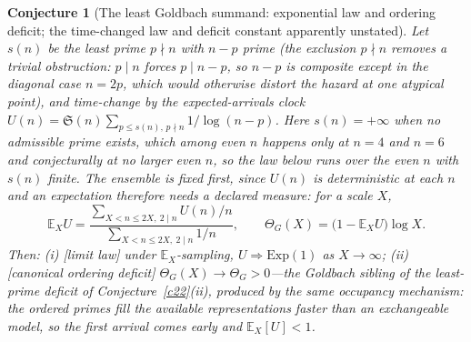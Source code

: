 \documentclass[11pt]{article}
\newtheorem{conjecture}{Conjecture}
\theoremstyle{definition}
\newcommand{\SG}{\mathfrak S}
\begin{document}
\setcounter{conjecture}{4}%
\begin{conjecture}[The least Goldbach summand: exponential law and
ordering deficit; the time-changed law and deficit constant
apparently unstated]\label{c15}
Let $s(n)$ be the least prime $p\nmid n$ with $n-p$ prime (the
exclusion $p\nmid n$ removes a trivial obstruction: $p\mid n$ forces $p\mid
n-p$, so $n-p$ is
composite except in the diagonal case $n=2p$, which would otherwise
distort the hazard at one atypical point), and
time-change by the expected-arrivals clock
$U(n)=\SG(n)\sum_{p\le s(n),\,p\nmid n}1/\log(n-p)$.  Here $s(n)=+\infty$ when no admissible prime exists, which among even $n$ happens only at $n=4$ and $n=6$ and conjecturally at no larger even $n$, so the law below runs over the even $n$ with $s(n)$ finite.  The ensemble is fixed first, since $U(n)$ is deterministic at each
$n$ and an expectation therefore needs a declared measure: for a scale
$X$,
\[
\mathbb E_XU=
\frac{\sum_{X<n\le2X,\ 2\mid n}U(n)/n}
{\sum_{X<n\le2X,\ 2\mid n}1/n},
\qquad
\Theta_G(X)=\bigl(1-\mathbb E_XU\bigr)\log X.
\]
Then: \emph{(i)} [limit law] under $\mathbb E_X$-sampling,
$U\Rightarrow\mathrm{Exp}(1)$ as $X\to\infty$;
\emph{(ii)} [canonical ordering deficit]
$\Theta_G(X)\to\Theta_G>0$---the Goldbach sibling of the
least-prime deficit of Conjecture~\ref{c22}(ii), produced by the
same occupancy mechanism: the ordered primes fill the available
representations faster than an exchangeable model, so the first
arrival comes \emph{early} and $\mathbb E_X[U]<1$.
\end{conjecture}
\end{document}

